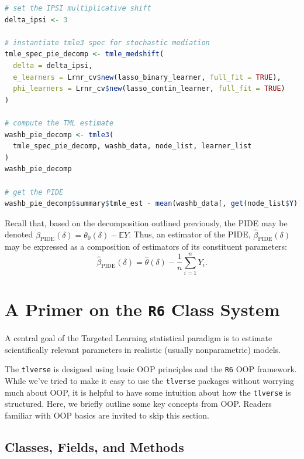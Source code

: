 \documentclass[
  12pt, krantz2,
]{krantz}
\newcommand{\passthrough}[1]{#1}
\theoremstyle{definition}
\theoremstyle{definition}
\theoremstyle{definition}
\newcommand{\1}{\mathbbm{1}}
\begin{document}
\begin{lstlisting}[language=R]
# set the IPSI multiplicative shift
delta_ipsi <- 3

# instantiate tmle3 spec for stochastic mediation
tmle_spec_pie_decomp <- tmle_medshift(
  delta = delta_ipsi,
  e_learners = Lrnr_cv$new(lasso_binary_learner, full_fit = TRUE),
  phi_learners = Lrnr_cv$new(lasso_contin_learner, full_fit = TRUE)
)

# compute the TML estimate
washb_pie_decomp <- tmle3(
  tmle_spec_pie_decomp, washb_data, node_list, learner_list
)
washb_pie_decomp

# get the PIDE
washb_pie_decomp$summary$tmle_est - mean(washb_data[, get(node_list$Y)])
\end{lstlisting}

Recall that, based on the decomposition outlined previously, the PIDE may be
denoted \(\beta_{\text{PIDE}}(\delta) = \theta_0(\delta) - \mathbb{E}Y\). Thus,
an estimator of the PIDE, \(\hat{\beta}_{\text{PIDE}}(\delta)\) may be expressed
as a composition of estimators of its constituent parameters:
\begin{equation*}
  \hat{\beta}_{\text{PIDE}}({\delta}) = \hat{\theta}(\delta) -
  \frac{1}{n} \sum_{i = 1}^n Y_i.
\end{equation*}

\hypertarget{r6}{%
\chapter{\texorpdfstring{A Primer on the \texttt{R6} Class System}{A Primer on the R6 Class System}}\label{r6}}

A central goal of the Targeted Learning statistical paradigm is to estimate
scientifically relevant parameters in realistic (usually nonparametric) models.

The \passthrough{\lstinline!tlverse!} is designed using basic OOP principles and the \passthrough{\lstinline!R6!} OOP framework.
While we've tried to make it easy to use the \passthrough{\lstinline!tlverse!} packages without worrying
much about OOP, it is helpful to have some intuition about how the \passthrough{\lstinline!tlverse!} is
structured. Here, we briefly outline some key concepts from OOP. Readers
familiar with OOP basics are invited to skip this section.

\hypertarget{classes-fields-and-methods}{%
\section{Classes, Fields, and Methods}\label{classes-fields-and-methods}}
\end{document}
